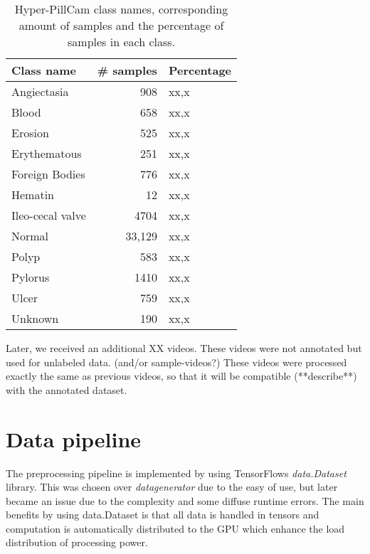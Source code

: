 \documentclass[thesis.tex]{subfiles}
\begin{document}
\begin{table} %
  \centering
  \begin{tabular}{|l|r|l|}
  	\hline
  	Class name & \# samples & Percentage \\
    \hline
    Angiectasia		& 908	& xx,x \\ 
    Blood			& 658	& xx,x \\ 
    Erosion			& 525	& xx,x \\ 
    Erythematous	& 251	& xx,x \\
    Foreign Bodies	& 776	& xx,x \\
    Hematin			& 12	& xx,x \\
    Ileo-cecal valve& 4704	& xx,x \\
    Normal			& 33,129& xx,x \\
    Polyp			& 583	& xx,x \\
    Pylorus			& 1410	& xx,x \\
    Ulcer			& 759	& xx,x \\
    Unknown			& 190	& xx,x \\
    \hline
  \end{tabular}
  \caption{Hyper-PillCam class names, corresponding amount of samples and the percentage of samples in each class.}
  \label{table:kvasir_pillcam_samples}
\end{table}

Later, we received an additional XX videos. These videos were not annotated but used for unlabeled data. (and/or sample-videos?)
These videos were processed exactly the same as previous videos, so that it will be compatible (**describe**) with the annotated dataset.



\section{Data pipeline} \label{sec:data_pipeline}
The preprocessing pipeline is implemented by using TensorFlows \textit{data.Dataset} library. This was chosen over \textit{datagenerator} due to the easy of use, but later became an issue due to the complexity and some diffuse runtime errors. The main benefits by using data.Dataset is that all data is handled in tensors and computation is automatically distributed to the GPU which enhance the load distribution of processing power. 
\end{document}
